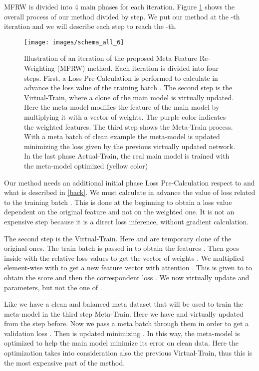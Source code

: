 \documentclass[runningheads]{llncs}
\begin{document}
	MFRW is divided into 4 main phases for each iteration. Figure \ref{fig:schema1} shows the overall process of our method divided by step. We put our method at the -th iteration and we will describe each step to reach the -th.
	
	\begin{figure}
		\centering
		\texttt{[image: images/schema\_all\_6]}
		\caption{Illustration of an iteration of the proposed Meta Feature Re-Weighting (MFRW) method. Each iteration is divided into four steps. First, a Loss Pre-Calculation is performed to calculate in advance the loss  value of the training batch . The second step is the Virtual-Train, where a clone of the main model is virtually updated. Here the meta-model modifies the feature of the main model by multiplying it with a vector of weights. The purple color indicates the weighted features. The third step shows the Meta-Train process. With a meta batch of clean example  the meta-model is updated minimizing the loss  given by the previous virtually updated network. In the last phase Actual-Train, the real main model is trained with the meta-model optimized (yellow color)}
		\label{fig:schema1}
	\end{figure}
	
	Our method needs an additional initial phase Loss Pre-Calculation respect to \cite{shu2019meta} and what is described in \ref{back}. We must calculate in advance the value of loss  related to the training batch . This is done at the beginning to obtain a loss value dependent on the original feature and not on the weighted one. It is not an expensive step because it is a direct loss inference, without gradient calculation.
	
	The second step is the Virtual-Train. Here  and  are temporary clone of the original ones. The train batch  is passed in  to obtain the features . Then  goes inside  with the relative loss values  to get the vector of weights . We multiplied element-wise  with  to get a new feature vector with attention . This is given to  to obtain the score  and then the correspondent loss . We now virtually update  and  parameters, but not the one of .
	
	Like \cite{shu2019meta} we have a clean and balanced meta dataset that will be used to train the meta-model  in the third step Meta-Train. Here we have  and  virtually updated from the step before. Now we pass a meta batch  through them in order to get a validation loss . Then  is updated minimizing . In this way, the meta-model is optimized to help the main model minimize its error on clean data. Here the optimization takes into consideration also the previous Virtual-Train, thus this is the most expensive part of the method.
	
\end{document}
